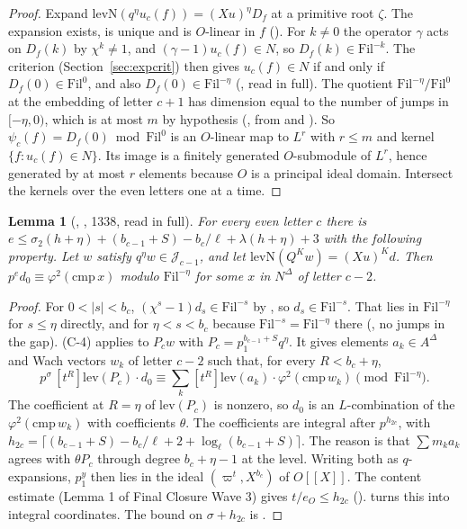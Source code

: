 \documentclass[11pt]{article}
\newcommand{\NN}{N^{\Delta}}
\newcommand{\Fil}{\mathrm{Fil}}
\newtheorem{lemma}{Lemma}
\theoremstyle{definition}
\theoremstyle{remark}
\begin{document}
\begin{proof}
Expand $\mathrm{levN}(q^\eta u_c(f))=(Xu)^\eta D_f$ at a primitive root $\zeta$. The expansion exists, is unique and is $O$-linear in $f$ (). For $k\ne0$ the operator $\gamma$ acts on $D_f(k)$ by $\chi^k\ne1$, and $(\gamma-1)u_c(f)\in N$, so $D_f(k)\in\Fil^{-k}$. The criterion  (Section~\ref{sec:expcrit}) then gives $u_c(f)\in N$ if and only if $D_f(0)\in\Fil^0$, and also $D_f(0)\in\Fil^{-\eta}$ (, read in full). The quotient $\Fil^{-\eta}/\Fil^0$ at the embedding of letter $c+1$ has dimension equal to the number of jumps in $[-\eta,0)$, which is at most $m$ by hypothesis (, from  and ). So $\psi_c(f)=D_f(0)\bmod\Fil^0$ is an $O$-linear map to $L^r$ with $r\le m$ and kernel $\{f:u_c(f)\in N\}$. Its image is a finitely generated $O$-submodule of $L^r$, hence generated by at most $r$ elements because $O$ is a principal ideal domain. Intersect the kernels over the even letters one at a time.
\end{proof}

\begin{lemma}[, , 1338, read in full]
For every even letter $c$ there is $e\le\sigma_2(h+\eta)+(b_{c-1}+S)-b_c/\ell+\lambda(h+\eta)+3$ with the following property. Let $w$ satisfy $q^\eta w\in\mathcal J_{c-1}$, and let $\mathrm{levN}(Q^Kw)=(Xu)^Kd$. Then $p^ed_0\equiv\varphi^2(\mathrm{cmp}\,x)$ modulo $\Fil^{-\eta}$ for some $x$ in $\NN$ of letter $c-2$.
\end{lemma}

\begin{proof}
For $0<\lvert s\rvert<b_c$, $(\chi^s-1)d_s\in\Fil^{-s}$ by , so $d_s\in\Fil^{-s}$. That lies in $\Fil^{-\eta}$ for $s\le\eta$ directly, and for $\eta<s<b_c$ because $\Fil^{-s}=\Fil^{-\eta}$ there (, no jumps in the gap).  (C-4) applies  to $P_cw$ with $P_c=p_1^{b_{c-1}+S}q^\eta$. It gives elements $a_k\in A^\Delta$ and Wach vectors $w_k$ of letter $c-2$ such that, for every $R<b_c+\eta$,
\[
p^{\sigma}\,[t^R]\mathrm{lev}(P_c)\cdot d_0\equiv\sum_k[t^R]\mathrm{lev}(a_k)\cdot\varphi^2(\mathrm{cmp}\,w_k)\pmod{\Fil^{-\eta}} .
\]
The coefficient at $R=\eta$ of $\mathrm{lev}(P_c)$ is nonzero, so $d_0$ is an $L$-combination of the $\varphi^2(\mathrm{cmp}\,w_k)$ with coefficients $\theta$. The coefficients are integral after $p^{h_{2c}}$, with $h_{2c}=\lceil(b_{c-1}+S)-b_c/\ell+2+\log_\ell(b_{c-1}+S)\rceil$. The reason is that $\sum m_ka_k$ agrees with $\theta P_c$ through degree $b_c+\eta-1$ at the level. Writing both as $q$-expansions, $p_1^y$ then lies in the ideal $(\varpi^t,X^{b_c})$ of $O[[X]]$. The content estimate  (Lemma 1 of Final Closure Wave 3) gives $t/e_O\le h_{2c}$ ().  turns this into integral coordinates. The bound on $\sigma+h_{2c}$ is .
\end{proof}
\end{document}
